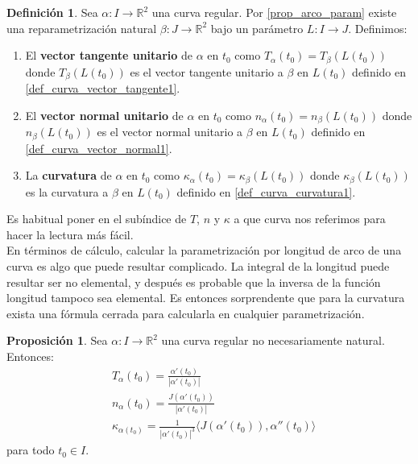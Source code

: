 \documentclass{article}
\theoremstyle{definition}
\newtheorem{prop}{Proposición}
\newtheorem{define}{Definición}
\newcommand{\reales}{\mathbb{R}}
\begin{document}
\begin{define}
	Sea $\alpha : I \rightarrow \reales^2$ una curva regular. Por \eqref{prop_arco_param} existe una reparametrización natural $\beta : J \rightarrow \reales^2$ bajo un parámetro $L : I \rightarrow J$. Definimos:
	\begin{enumerate}
		\item
		El \textbf{vector tangente unitario} de $\alpha$ en $t_0$ como $T_{\alpha}(t_0) = T_{\beta}(L(t_0))$ donde $T_{\beta}(L(t_0))$ es el vector tangente unitario a $\beta$ en $L(t_0)$ definido en \eqref{def_curva_vector_tangente1}.
		\item
		El \textbf{vector normal unitario} de $\alpha$ en $t_0$ como $n_{\alpha}(t_0) = n_{\beta}(L(t_0))$ donde $n_{\beta}(L(t_0))$ es el vector normal unitario a $\beta$ en $L(t_0)$ definido en \eqref{def_curva_vector_normal1}.
		\item
		La \textbf{curvatura} de $\alpha$ en $t_0$ como $\kappa_{\alpha}(t_0) = \kappa_{\beta}(L(t_0))$ donde $\kappa_{\beta}(L(t_0))$ es la curvatura a $\beta$ en $L(t_0)$ definido en \eqref{def_curva_curvatura1}.
	\end{enumerate}
\end{define}

Es habitual poner en el subíndice de $T$, $n$ y $\kappa$ a que curva nos referimos para hacer la lectura más fácil.\\ 
En términos de cálculo, calcular la parametrización por longitud de arco de una curva es algo que puede resultar complicado. La integral de la longitud puede resultar ser no elemental, y después es probable que la inversa de la función longitud tampoco sea elemental. Es entonces sorprendente que para la curvatura exista una fórmula cerrada para calcularla en cualquier parametrización.

\begin{prop}
	Sea $\alpha : I \rightarrow \reales^2$ una curva regular no necesariamente natural. Entonces:
	\begin{equation*}
	\begin{split}
		& T_{\alpha}(t_0) = \frac{\alpha'(t_0)}{|\alpha'(t_0)|} \\ 
		& n_{\alpha}(t_0) = \frac{J(\alpha'(t_0))}{|\alpha'(t_0)|} \\ 
		& \kappa_{\alpha(t_0)} = \frac{1}{|\alpha'(t_0)|^3} \langle J(\alpha'(t_0)), \alpha''(t_0) \rangle
	\end{split}
	\end{equation*}
	para todo $t_0 \in I$. 
\end{prop}
\end{document}
